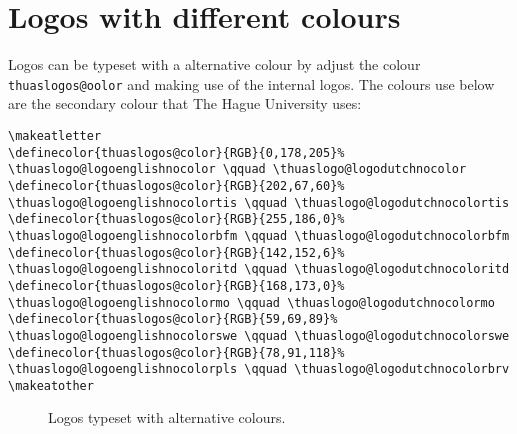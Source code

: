 \documentclass[a4paper,12pt]{article}
\begin{document}
\section{Logos with different colours}
\label{anderekleur}
Logos can be typeset with a alternative colour by adjust the colour \verb|thuaslogos@oolor|
and making use of the internal logos. The colours use below are the secondary colour that
The Hague University uses:

\begin{verbatim}
\makeatletter
\definecolor{thuaslogos@color}{RGB}{0,178,205}%
\thuaslogo@logoenglishnocolor \qquad \thuaslogo@logodutchnocolor
\definecolor{thuaslogos@color}{RGB}{202,67,60}%
\thuaslogo@logoenglishnocolortis \qquad \thuaslogo@logodutchnocolortis
\definecolor{thuaslogos@color}{RGB}{255,186,0}%
\thuaslogo@logoenglishnocolorbfm \qquad \thuaslogo@logodutchnocolorbfm
\definecolor{thuaslogos@color}{RGB}{142,152,6}%
\thuaslogo@logoenglishnocoloritd \qquad \thuaslogo@logodutchnocoloritd
\definecolor{thuaslogos@color}{RGB}{168,173,0}%
\thuaslogo@logoenglishnocolormo \qquad \thuaslogo@logodutchnocolormo
\definecolor{thuaslogos@color}{RGB}{59,69,89}%
\thuaslogo@logoenglishnocolorswe \qquad \thuaslogo@logodutchnocolorswe
\definecolor{thuaslogos@color}{RGB}{78,91,118}%
\thuaslogo@logoenglishnocolorpls \qquad \thuaslogo@logodutchnocolorbrv
\makeatother
\end{verbatim}

\begin{figure}[H]
\centering
\makeatletter
{}%
\resizebox{0.9\textwidth}{!}{\thuaslogo@logoenglishnocolor \qquad \thuaslogo@logodutchnocolor}
\vskip20pt
%
\resizebox{0.9\textwidth}{!}{\thuaslogo@logoenglishnocolortis \qquad \thuaslogo@logodutchnocolortis}
\vskip20pt
%
\resizebox{0.9\textwidth}{!}{\thuaslogo@logoenglishnocolorbfm \qquad \thuaslogo@logodutchnocolorbfm}
\vskip20pt
%
\resizebox{0.9\textwidth}{!}{\thuaslogo@logoenglishnocoloritd \qquad \thuaslogo@logodutchnocoloritd}
\vskip20pt
%
\resizebox{0.9\textwidth}{!}{\thuaslogo@logoenglishnocolormo \qquad \thuaslogo@logodutchnocolormo}
\vskip20pt
%
\resizebox{0.9\textwidth}{!}{\thuaslogo@logoenglishnocolorswe \qquad \thuaslogo@logodutchnocolorswe}
\vskip20pt
%
\resizebox{0.9\textwidth}{!}{\thuaslogo@logoenglishnocolorpls \qquad \thuaslogo@logodutchnocolorbrv}
\makeatother
\caption{Logos typeset with alternative colours.}
\end{figure}
\end{document}
